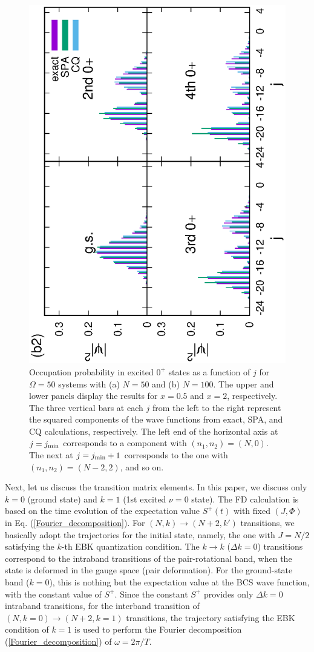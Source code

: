 \documentclass[11pt]{book} %
\begin{document}
\begin{figure}[t]
\begin{minipage}{1\hsize}
\begin{center}
  \includegraphics[height=0.45\textwidth,angle=-90]{images/N100Xeq2occ_wo_adiabatic.eps}
 \end{center}
 \end{minipage}
 \caption{
Occupation probability in excited $0^+$ states
as a function of $j$ for $\Omega=50$ systems
with (a) $N=50$ and (b) $N=100$.
The upper and lower panels display the results for $x=0.5$ and $x=2$,
respectively. 
The three vertical bars at each $j$ from the left to the right represent
the squared components of the wave functions
from exact, SPA, and CQ calculations, respectively.
The left end of the horizontal axis at $j=j_{\rm min}$
corresponds to a component with $(n_1,n_2)=(N,0)$.
The next at $j=j_{\rm min}+1$ corresponds to the one with
$(n_1,n_2)=(N-2,2)$, and so on.
}
 \label{fig:N50_occ}
\end{figure}

Next, let us discuss the transition matrix elements.
In this paper, we discuss only $k=0$ (ground state) and $k=1$
(1st excited $\nu=0$ state).
The FD calculation is based on the time evolution of the expectation 
value $S^+(t)$ with fixed $(J,\Phi)$ in Eq. (\ref{Fourier_decomposition}).
For $(N,k)\rightarrow (N+2,k')$ transitions,
we basically adopt the trajectories for the initial state, namely,
the one with $J=N/2$ satisfying the $k$-th EBK quantization condition.
The $k\rightarrow k$ ($\Delta k = 0$)  transitions
correspond to the intraband transitions of the
pair-rotational band, when the state is deformed in the
gauge space (pair deformation).
For the ground-state band ($k=0$),
this is nothing but the expectation value at the BCS wave function,
with the constant value of $S^+$.
Since the constant $S^+$ provides only $\Delta k=0$ intraband transitions,
for the interband transition of $(N,k=0)\rightarrow (N+2,k=1)$
transitions, the trajectory satisfying the EBK condition of $k=1$ is used to
perform the Fourier decomposition (\ref{Fourier_decomposition})
of $\omega=2\pi/T$.
\end{document}
